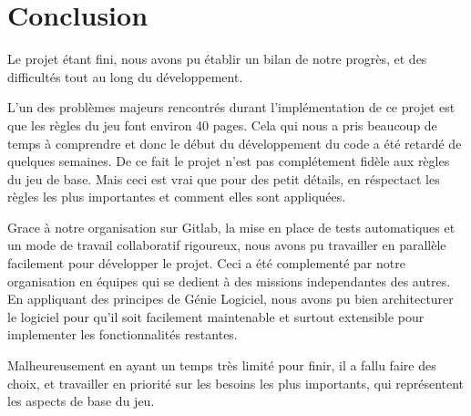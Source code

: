 \section{Conclusion}
Le projet étant fini, nous avons pu établir un bilan de notre progrès, et des difficultés tout au long du développement.

L'un des problèmes majeurs rencontrés durant l'implémentation de ce projet est que les règles du jeu font environ 40 pages.
Cela qui nous a pris beaucoup de temps à comprendre et donc le début du développement du code a été retardé de quelques semaines.
De ce fait le projet n'est pas complétement fidèle aux règles du jeu de base. Mais ceci est vrai que pour des petit détails, en réspectact les règles les
plus importantes et comment elles sont appliquées.

Grace à notre organisation sur Gitlab, la mise en place de tests automatiques et un mode de travail collaboratif rigoureux, nous avons pu travailler en parallèle facilement
pour développer le projet. Ceci a été complementé par notre organisation en équipes qui se dedient à des missions independantes des autres. En appliquant des principes de
Génie Logiciel, nous avons pu bien architecturer le logiciel pour qu'il soit facilement maintenable et surtout extensible pour implementer les fonctionnalités restantes.

Malheureusement en ayant un temps très limité pour finir, il a fallu faire des choix, et travailler en priorité sur les besoins les plus importants, qui représentent
les aspects de base du jeu.


